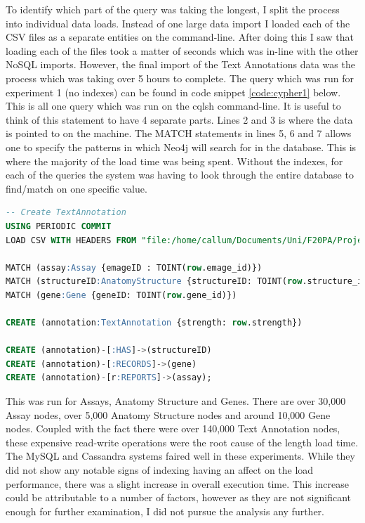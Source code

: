 To identify which part of the query was taking the longest, I split the process into individual data loads. Instead of one large data import I loaded each of the CSV files as a separate entities on the command-line. After doing this I saw that loading each of the files took a matter of seconds which was in-line with the other NoSQL imports. However, the final import of the Text Annotations data was the process which was taking over 5 hours to complete. The query which was run for experiment 1 (no indexes) can be found in code snippet \ref{code:cypher1} below. This is all one query which was run on the cqlsh command-line. It is useful to think of this statement to have 4 separate parts. Lines 2 and 3 is where the data is pointed to on the machine. The MATCH statements in lines 5, 6 and 7 allows one to specify the patterns in which Neo4j will search for in the database. This is where the majority of the load time was being spent. Without the indexes, for each of the queries the system was having to look through the entire database to find/match on one specific value.
\begin{lstlisting}[language=SQL, caption=Cypher file to load text annotations data into the Neo4j data model., label=code:cypher1]
-- Create TextAnnotation
USING PERIODIC COMMIT
LOAD CSV WITH HEADERS FROM "file:/home/callum/Documents/Uni/F20PA/Project/Neo4j/Data/TextAnnotations.csv" AS row

MATCH (assay:Assay {emageID : TOINT(row.emage_id)})
MATCH (structureID:AnatomyStructure {structureID: TOINT(row.structure_id)})
MATCH (gene:Gene {geneID: TOINT(row.gene_id)})

CREATE (annotation:TextAnnotation {strength: row.strength})

CREATE (annotation)-[:HAS]->(structureID)
CREATE (annotation)-[:RECORDS]->(gene)
CREATE (annotation)-[r:REPORTS]->(assay);
\end{lstlisting}

\parindent 0pt
This was run for Assays, Anatomy Structure and Genes. There are over 30,000 Assay nodes, over 5,000 Anatomy Structure nodes and around 10,000 Gene nodes. Coupled with the fact there were over 140,000 Text Annotation nodes, these expensive read-write operations were the root cause of the length load time.
\parindent 15pt
The MySQL and Cassandra systems faired well in these experiments. While they did not show any notable signs of indexing having an affect on the load performance, there was a slight increase in overall execution time. This increase could be attributable to a number of factors, however as they are not significant enough for further examination, I did not pursue the analysis any further.